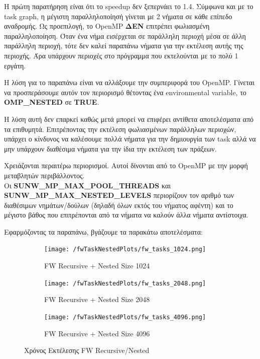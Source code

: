 \documentclass[letterpaper,12pt]{article}
\begin{document}
Η πρώτη παρατήρηση είναι ότι το speedup δεν ξεπερνάει το 1.4. Σύμφωνα και με το task graph, η μέγιστη
παραλληλοποίησή γίνεται με 2 νήματα σε κάθε επίπεδο αναδρομής. Ως προεπιλογή, το OpenMP \textbf{ΔΕΝ}
επιτρέπει φωλιασμένη παραλληλοποίηση. Όταν ένα νήμα εισέρχεται σε παράλληλη περιοχή μέσα σε άλλη παράλληλη περιοχή,
τότε δεν καλεί παραπάνω νήματα για την εκτέλεση αυτής της περιοχής. Άρα υπάρχουν περιοχές στο πρόγραμμα που εκτελούνται
με το πολύ 1 εργάτη.

Η λύση για το παραπάνω είναι να αλλάξουμε την συμπεριφορά του OpenMP. Γίνεται να προσπεράσουμε αυτόν τον περιορισμό
θέτοντας ένα environmental variable, το \textbf{OMP\_NESTED}
σε \textbf{TRUE}.

Η λύση αυτή δεν επαρκεί καθώς μετά μπορεί να επιφέρει αντίθετα αποτελέσματα από τα επιθυμητά.
Επιτρέποντας την εκτέλεση φωλιασμένων παράλληλων περιοχών, υπάρχει ο κίνδυνος να καλέσουμε πολλά νήματα για την
δημιουργία των task αλλά να μην υπάρχουν διαθέσιμα νήματα για την ίδια την εκτέλεση των πράξεων.

Χρειάζονται περαιτέρω περιορισμοί. Αυτοί δίνονται από το OpenMP με την μορφή μεταβλητών
περιβάλλοντος.
\\
Οι \textbf{SUNW\_MP\_MAX\_POOL\_THREADS} και 
\textbf{SUNW\_MP\_MAX\_NESTED\_LEVELS} περιορίζουν τον αριθμό των διαθέσιμων
νημάτων/δούλων (δηλαδή όλων εκτός του νήματος αφέντη) και το μέγιστο βάθος που επιτρέπονται από τα νήματα να καλούν
άλλα νήματα αντίστοιχα.

Εφαρμόζοντας τα παραπάνω, βγάζουμε τα παρακάτω αποτελέσματα:

\begin{figure}[H]
    \centering
    \begin{subfigure}[b]{0.45\linewidth}
        \texttt{[image: /fwTaskNestedPlots/fw\_tasks\_1024.png]}
        \caption{FW Recursive + Nested Size 1024}
    \end{subfigure}
    \begin{subfigure}[b]{0.45\linewidth}
        \texttt{[image: /fwTaskNestedPlots/fw\_tasks\_2048.png]}
        \caption{FW Recursive + Nested Size 2048}
    \end{subfigure}
    \begin{subfigure}[b]{0.5\linewidth}
        \texttt{[image: /fwTaskNestedPlots/fw\_tasks\_4096.png]}
        \caption{FW Recursive + Nested Size 4096}
    \end{subfigure}
    \caption{Χρόνος Εκτέλεσης FW Recursive/Nested}
    \label{fig:Χρόνος Εκτέλεσης FW Recursive/Nested}
\end{figure}
\end{document}
